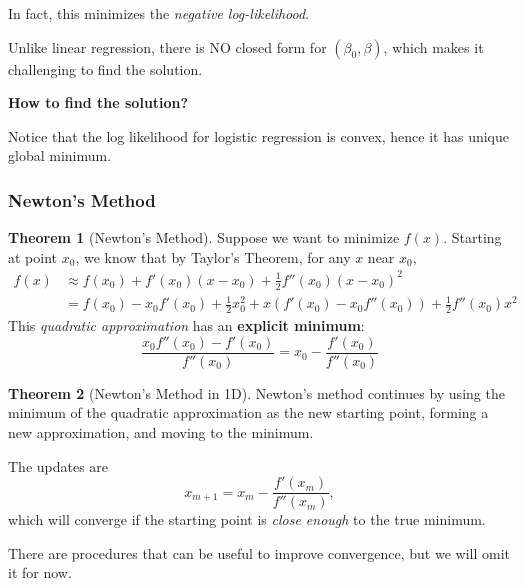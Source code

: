 \documentclass[11pt]{article}
\theoremstyle{definition}
\newtheorem{theorem}{Theorem}[section]
\numberwithin{equation}{section}
\begin{document}
\begin{writenotes}
In fact, this minimizes the \textit{negative log-likelihood}.

Unlike linear regression, there is NO closed form for $(\beta_0, \beta)$, which makes it challenging to find the solution.
\end{writenotes}

\textbf{How to find the solution?}

Notice that the log likelihood for logistic regression is convex, hence it has unique global minimum.

\subsubsection{Newton's Method}

\begin{theorem}[Newton's Method]
  Suppose we want to minimize $f(x)$. Starting at point $x_0$, we know that by Taylor's Theorem, for any $x$ near $x_0$,
  \begin{align}
    f(x)&\approx f(x_0) + f'(x_0)(x - x_0) + \frac{1}{2}f''(x_0)(x - x_0)^2\\
    &= f(x_0) - x_0f'(x_0) + \frac{1}{2}x_0^2 + x(f'(x_0) - x_0f''(x_0)) + \frac{1}{2}f''(x_0)x^2
  \end{align}
  This \textit{quadratic approximation} has an \textbf{explicit minimum}:
  \begin{equation}
    \frac{x_0f''(x_0) - f'(x_0)}{f''(x_0)} = x_0 - \frac{f'(x_0)}{f''(x_0)}
  \end{equation}
\end{theorem}

\begin{theorem}[Newton's Method in 1D]
  Newton's method continues by using the minimum of the quadratic approximation as the new starting point, forming a new approximation, and moving to the minimum.

  The updates are
  \begin{equation}
    x_{m+1} = x_m - \frac{f'(x_m)}{f''(x_m)},
  \end{equation}
  which will converge if the starting point is \textit{close enough} to the true minimum.

  \begin{writenotes}
    There are procedures that can be useful to improve convergence, but we will omit it for now.
  \end{writenotes}
\end{theorem}
\end{document}
